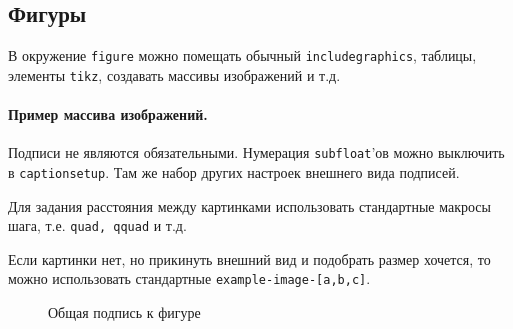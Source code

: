 \subsection{Фигуры}
В окружение \texttt{figure} можно помещать обычный \texttt{includegraphics}, таблицы, элементы \texttt{tikz}, создавать массивы изображений и т.д. 

\paragraph{Пример массива изображений.}
Подписи не являются обязательными. Нумерация \texttt{subfloat}'ов можно выключить в \texttt{captionsetup}. Там же набор других настроек внешнего вида подписей.

Для задания расстояния между картинками использовать стандартные макросы шага, т.е. \texttt{quad, qquad} и т.д.

Если картинки нет, но прикинуть внешний вид и подобрать размер хочется, то можно использовать стандартные \texttt{example-image-[a,b,c]}.

\begin{figure}[H]
	\centering
	\captionsetup[subfigure]{justification=centering}
	\quad
	\quad
	\quad
	\caption{Общая подпись к фигуре}
\end{figure}
